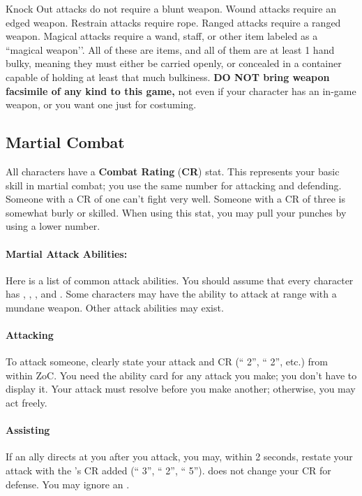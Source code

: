 \documentclass[sheet]{GL2020}
\begin{document}
Knock Out attacks do not require a blunt weapon. Wound attacks require an edged weapon. Restrain attacks require rope. Ranged attacks require a ranged weapon.  Magical attacks require a wand, staff, or other item labeled as a ``magical weapon’’. All of these are items, and all of them are at least 1 hand bulky, meaning they must either be carried openly, or concealed in a container capable of holding at least that much bulkiness. \textbf{DO NOT bring weapon facsimile of any kind to this game,} not even if your character has an in-game weapon, or you want one just for costuming.


\subsection{Martial Combat}
All characters have a {\bf Combat Rating} ({\bf CR}) stat.  This represents your basic skill in martial combat; you use the same number for attacking and defending.  Someone with a CR of one can't fight very well.  Someone with a CR of three is somewhat burly or skilled. When using this stat, you may pull your punches by using a lower number.

\paragraph{Martial Attack Abilities:} Here is a list of common attack abilities.  You should assume that every character has \aKnockOut{}, \aWound{},  \aAssist{}, and \aRestrain{}. Some characters may have the ability to attack at range with a mundane weapon. Other attack abilities may exist.

\paragraph{Attacking}To attack someone, clearly state your attack and CR (``\aKnockOut{} 2'', ``\aWound{} 2'', etc.) from within ZoC.  You need the ability card for any attack you make; you don't have to display it.  Your attack must resolve before you make another; otherwise, you may act freely. 

\paragraph{Assisting}  If an ally directs {\bf \aAssist{}} at you after you attack, you may, within 2 seconds, restate your attack with the \aAssist{}'s CR added (``\aWound{} 3'', ``\aAssist{} 2'', ``\aWound{} 5'').  \aAssist{} does not change your CR for defense.  You may ignore an \aAssist{}.
\end{document}

